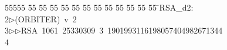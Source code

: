 %
%
\begin{tabbing}
55555 \= 55 \= 55 \= 55 \= 55 \= 55 \= 55 \= 55 \= 55 \= 55 \= 55 \= 55 \= 55 \= \>RSA\_d2:\\[0pt]
2\>$\triangleright$\>(ORBITER)\ v\ 2\ \\[0pt]
3\>$\triangleright$\>$\triangleright$\>RSA\ 1061\ 25330309\ 3\ 1901993116198057404982671344\\[0pt]
4\>\end{tabbing}
